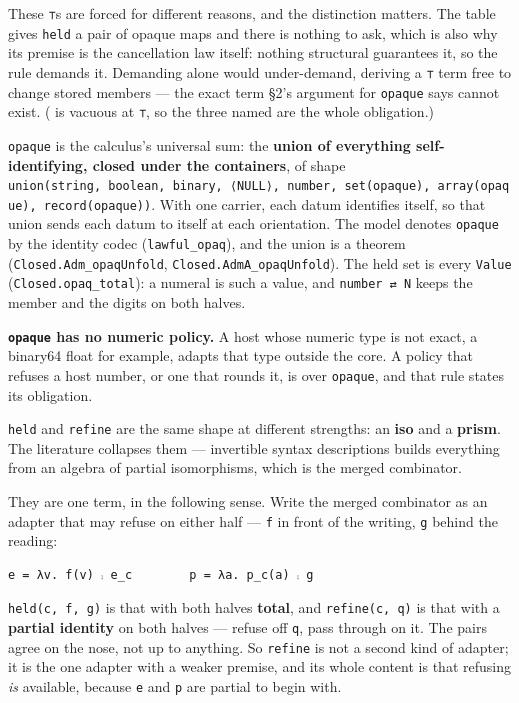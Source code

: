 These \texttt{⊤}s are forced for different reasons, and the distinction matters. The table gives \texttt{held} a pair of opaque maps and there is nothing to ask, which is also why its
premise is the cancellation law itself: nothing structural guarantees it, so the rule demands it.
Demanding  alone would under-demand, deriving a \texttt{⊤} term free to change stored members — the
exact term §2's argument for \texttt{opaque} says cannot exist. ( is vacuous at \texttt{⊤}, so the three
named are the whole obligation.)

\texttt{opaque} is the calculus's universal sum: the \textbf{union of everything self-identifying,
closed under the containers}, of shape
\texttt{union(string,\ boolean,\ binary,\ ⟨NULL⟩,\ number,\ set(opaque),\ array(opaque),\ record(opaque))}.
With one carrier, each datum identifies itself, so that union sends each datum to itself at each
orientation. The model denotes \texttt{opaque} by the identity codec (\texttt{lawful\_opaq}), and the
union is a theorem (\texttt{Closed.Adm\_opaqUnfold}, \texttt{Closed.AdmA\_opaqUnfold}). The held set is every
\texttt{Value} (\texttt{Closed.opaq\_total}): a numeral is such a value, and \texttt{number\ ⇄\ N} keeps the member
and the digits on both halves.

\textbf{\texttt{opaque} has no numeric policy.} A host whose numeric type is not exact, a binary64 float for
example, adapts that type outside the core. A policy that refuses a host number, or one that rounds it,
is  over \texttt{opaque}, and that rule states its obligation.

\texttt{held} and \texttt{refine} are the same shape at different strengths: an \textbf{iso} and a \textbf{prism}. The
literature collapses them — invertible syntax descriptions \cite{invertible-syntax} builds everything from an algebra of
partial isomorphisms, which is the merged combinator.

They are one term, in the following sense. Write the merged combinator
as an adapter that may refuse on either half — \texttt{f} in front of the writing, \texttt{g} behind the reading:

\begin{verbatim}
e = λv. f(v) ⨾ e_c        p = λa. p_c(a) ⨾ g
\end{verbatim}

\texttt{held(c,\ f,\ g)} is that with both halves \textbf{total}, and \texttt{refine(c,\ q)} is that with a \textbf{partial
identity} on both halves — refuse off \texttt{q}, pass through on it. The pairs agree on the nose, not up
to anything. So \texttt{refine} is not a second kind of adapter; it is the one adapter with a weaker
premise, and its whole content is that refusing \emph{is} available, because \texttt{e} and \texttt{p} are partial to
begin with.

